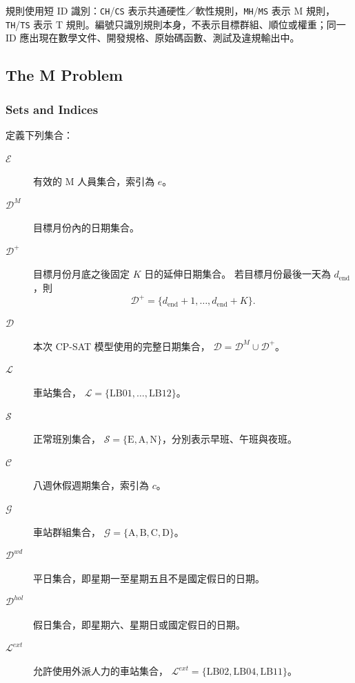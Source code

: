 \documentclass[12pt]{article}
\begin{document}
規則使用短 ID 識別：\texttt{CH}/\texttt{CS} 表示共通硬性／軟性規則，\texttt{MH}/\texttt{MS} 表示 M 規則，\texttt{TH}/\texttt{TS} 表示 T 規則。編號只識別規則本身，不表示目標群組、順位或權重；同一 ID 應出現在數學文件、開發規格、原始碼函數、測試及違規輸出中。

\subsection{The M Problem}

\subsubsection{Sets and Indices}

定義下列集合：

\begin{description}
  \item[\(\mathcal{E}\)] 有效的 M 人員集合，索引為 \(e\)。

  \item[\(\mathcal{D}^{M}\)] 目標月份內的日期集合。

  \item[\(\mathcal{D}^{+}\)] 目標月份月底之後固定 \(K\) 日的延伸日期集合。
    若目標月份最後一天為 \(d_{\mathrm{end}}\)，則
    \[
      \mathcal{D}^{+}
      =
      \{d_{\mathrm{end}}+1,\ldots,d_{\mathrm{end}}+K\}.
    \]

  \item[\(\mathcal{D}\)] 本次 CP-SAT 模型使用的完整日期集合，
    \(\mathcal{D}=\mathcal{D}^{M}\cup\mathcal{D}^{+}\)。

  \item[\(\mathcal{L}\)] 車站集合，
    \(\mathcal{L}=\{\mathrm{LB01},\ldots,\mathrm{LB12}\}\)。

  \item[\(\mathcal{S}\)] 正常班別集合，
    \(\mathcal{S}=\{\mathrm{E},\mathrm{A},\mathrm{N}\}\)，分別表示早班、午班與夜班。

  \item[\(\mathcal{C}\)] 八週休假週期集合，索引為 \(c\)。

  \item[\(\mathcal{G}\)] 車站群組集合，
    \(\mathcal{G}=\{\mathrm{A},\mathrm{B},\mathrm{C},\mathrm{D}\}\)。

  \item[\(\mathcal{D}^{wd}\)] 平日集合，即星期一至星期五且不是國定假日的日期。

  \item[\(\mathcal{D}^{hol}\)] 假日集合，即星期六、星期日或國定假日的日期。

  \item[\(\mathcal{L}^{ext}\)] 允許使用外派人力的車站集合，
    \(\mathcal{L}^{ext}=\{\mathrm{LB02},\mathrm{LB04},\mathrm{LB11}\}\)。
\end{description}
\end{document}
